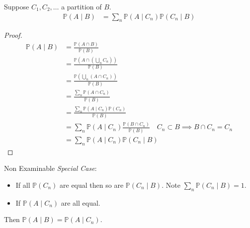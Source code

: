 \begin{theorem}
    Suppose $C_1, C_2, \dots$ a partition of $B$.
    \begin{align*}
    \mathbb{P}(A \mid B) &= \sum_n \mathbb{P}(A \mid C_n) \mathbb{P}(C_n \mid B)
    \end{align*} 
\end{theorem} 

\begin{proof}
    \begin{align*}
        \mathbb{P}(A \mid B) &= \frac{\mathbb{P}(A \cap B)}{\mathbb{P}(B)} \\
        &= \frac{\mathbb{P}\left(A \cap \left( \bigcup_n C_n \right)\right)}{\mathbb{P}(B)} \\
        &= \frac{\mathbb{P}\left( \bigcup_n (A \cap C_n) \right)}{\mathbb{P}(B)} \\
        &= \frac{\sum_n \mathbb{P}(A \cap C_n)}{\mathbb{P}(B)} \\
        &= \frac{\sum_n \mathbb{P}(A \mid C_n) \mathbb{P}(C_n)}{\mathbb{P}(B)} \\
        &= \sum_n \mathbb{P}(A \mid C_n) \frac{\mathbb{P}(B \cap C_n)}{\mathbb{P}(B)} \quad C_n \subset B \implies B \cap C_n = C_n \\
        &= \sum_n \mathbb{P}(A \mid C_n) \mathbb{P}(C_n \mid B)
    \end{align*} 
\end{proof} 

\begin{aside}{Non Examinable}
    \emph{Special Case}: 
    \begin{itemize}
        \item If all $\mathbb{P}(C_n)$ are equal then so are $\mathbb{P}(C_n \mid B)$. Note $\sum_n \mathbb{P}(C_n \mid B) = 1$.
        \item If $\mathbb{P}(A \mid C_n)$ are all equal.
    \end{itemize} 

    Then $\mathbb{P}(A \mid B) = \mathbb{P}(A \mid C_n)$.

\end{aside} 

